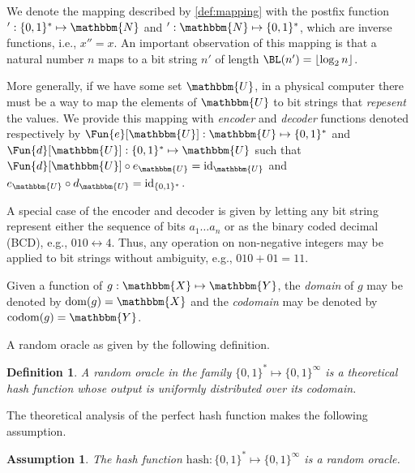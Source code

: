 \documentclass[hidelinks,11pt,final]{article}
\newcommand{\envnumstyle}{section}
\theoremstyle{plain}
\newtheorem{definition}{Definition}[\envnumstyle]
\newtheorem{assumption}{Assumption}
\begin{document}
We denote the mapping described by \cref{def:mapping} with the postfix function $' : \{0,1\}^* \mapsto \mathbbm{N}$ and $' : \mathbbm{N} \mapsto \{0,1\}^*$, which are inverse functions, i.e., $x'' = x$.
An important observation of this mapping is that a natural number $n$ maps to a bit string $n'$ of length $\BL(n') = \lfloor \log_2 n \rfloor$.

More generally, if we have some set $\mathbbm{U}$, in a physical computer there must be a way to map the elements of $\mathbbm{U}$ to bit strings that \emph{repesent} the values.
We provide this mapping with \emph{encoder} and \emph{decoder} functions denoted respectively by $\Fun{e}[\mathbbm{U}] : \mathbbm{U} \mapsto \{0,1\}^*$ and $\Fun{d}[\mathbbm{U}] : \{0,1\}^* \mapsto \mathbbm{U}$ such that $\Fun{d}[\mathbbm{U}] \circ e_\mathbbm{U} = \mathrm{id}_\mathbbm{U}$ and $e_\mathbbm{U} \circ d_\mathbbm{U} = \mathrm{id}_{\{0,1\}^*}$.

A special case of the encoder and decoder is given by letting any bit string represent either the sequence of bits $a_1 \ldots a_n$ or as the binary coded decimal (BCD), e.g., $010 \longleftrightarrow 4$.
Thus, any operation on non-negative integers may be applied to bit strings without ambiguity, e.g., $010 + 01 = 11$.

Given a function of $g : \mathbbm{X} \mapsto \mathbbm{Y}$, the \emph{domain} of $g$ may be denoted by $\mathrm{dom}(g) = \mathbbm{X}$ and the \emph{codomain} may be denoted by $\mathrm{codom}(g) = \mathbbm{Y}$.

A random oracle as given by the following definition.
\begin{definition}
\label{def:randomoracle}
A random oracle in the family $\{0,1\}^{*} \mapsto \{0,1\}^{\infty}$ is a theoretical \emph{hash function} whose output is uniformly distributed over its codomain.
\end{definition}

The theoretical analysis of the perfect hash function makes the following assumption.
\begin{assumption}
\label{asm:ro_approx}
The hash function $\mathrm{hash} : \{0,1\}^{*} \mapsto \{0,1\}^{\infty}$ is a random oracle.
\end{assumption}

\end{document}
